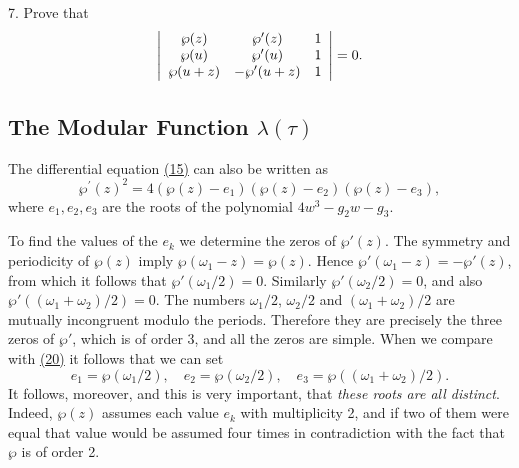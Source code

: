 7. Prove that
\begin{equation*}
\left| \begin{array}{c c c} \wp (z) & \wp^ {\prime} (z) & 1 \\ \wp (u) & \wp^ {\prime} (u) & 1 \\ \wp (u + z) & - \wp^ {\prime} (u + z) & 1 \end{array} \right| = 0.
\end{equation*}
\setcounter{section}{3}\setcounter{subsection}{3}\subsection{\texorpdfstring{The Modular Function $\lambda(\tau)$}{The Modular Function λ(τ)}}\label{sec:7.3.4}
The differential equation \hyperref[eq:7.15]{(15)} can also be written as
\begin{equation*}
\wp^ {\prime} (z) ^ {2} = 4 (\wp (z) - e _ {1}) (\wp (z) - e _ {2}) (\wp (z) - e _ {3}),\tag{20}\label{eq:7.20}
\end{equation*}
where $e_1, e_2, e_3$ are the roots of the polynomial $4w^3 - g_2w - g_3$.

To find the values of the $e_{k}$ we determine the zeros of $\wp'(z)$. The symmetry and periodicity of $\wp(z)$ imply $\wp(\omega_{1}-z)=\wp(z)$. Hence $\wp'(\omega_{1}-z)=-\wp'(z)$, from which it follows that $\wp'(\omega_{1}/2)=0$. Similarly $\wp'(\omega_{2}/2)=0$, and also $\wp'((\omega_{1}+\omega_{2})/2)=0$. The numbers $\omega_{1}/2$, $\omega_{2}/2$ and $(\omega_{1}+\omega_{2})/2$ are mutually incongruent modulo the periods. Therefore they are precisely the three zeros of $\wp'$, which is of order 3, and all the zeros are simple. When we compare with \hyperref[eq:7.20]{(20)} it follows that we can set
\begin{equation*}
e _ {1} = \wp (\omega_ {1} / 2), \quad e _ {2} = \wp (\omega_ {2} / 2), \quad e _ {3} = \wp ((\omega_ {1} + \omega_ {2}) / 2).\tag{21}\label{eq:7.21}
\end{equation*}
It follows, moreover, and this is very important, that \emph{these roots are all distinct}. Indeed, $\wp(z)$ assumes each value $e_k$ with multiplicity 2, and if two of them were equal that value would be assumed four times in contradiction with the fact that $\wp$ is of order 2.

